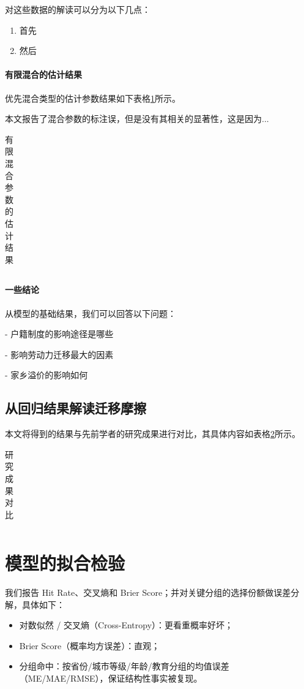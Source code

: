 \documentclass[
  a4paper,
  zihao=-4,
  fontset=mac,
  AutoFakeBold,
  AutoFakeSlant,
  oneside]{ctexbook}
\begin{document}
对这些数据的解读可以分为以下几点：
\begin{enumerate}
  \item 首先
  \item 然后
\end{enumerate}


\paragraph{有限混合的估计结果} 

优先混合类型的估计参数结果如下表格\ref{tab:有限混合参数的估计结果}所示。

本文报告了混合参数的标注误，但是没有其相关的显著性，这是因为...

\begin{table}[!ht]
\centering
\caption{有限混合参数的估计结果}
\begin{tabularx}{\textwidth}{@{}cXXX@{}}
\toprule
\midrule
\bottomrule
\end{tabularx}
\label{tab:有限混合参数的估计结果}
\end{table}


\paragraph{一些结论}

从模型的基础结果，我们可以回答以下问题：

- 户籍制度的影响途径是哪些

- 影响劳动力迁移最大的因素

- 家乡溢价的影响如何


\subsection{从回归结果解读迁移摩擦}
本文将得到的结果与先前学者的研究成果进行对比，其具体内容如表格\ref{tab:研究成果对比}所示。
\begin{table}[!ht]
\centering
\caption{研究成果对比}
\begin{tabularx}{\textwidth}{@{}cXXX@{}}
\toprule
\midrule
\bottomrule
\end{tabularx}
\label{tab:研究成果对比}
\end{table}



\section{模型的拟合检验} 


我们报告 Hit Rate、交叉熵和 Brier Score；并对关键分组的选择份额做误差分解，具体如下：
\begin{itemize}
  \item 对数似然 / 交叉熵（Cross-Entropy）：更看重概率好坏；
  \item Brier Score（概率均方误差）：直观；
  \item 分组命中：按省份/城市等级/年龄/教育分组的均值误差（ME/MAE/RMSE），保证结构性事实被复现。
\end{itemize}
\end{document}
